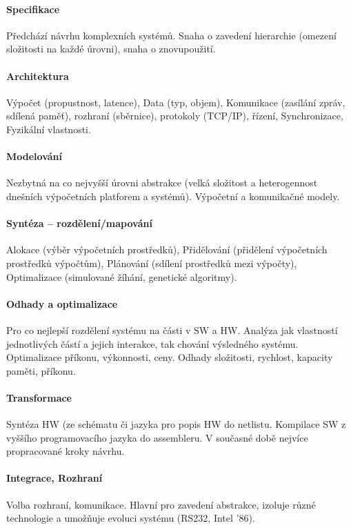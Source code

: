 \documentclass[a4paper, 11pt]{report}
\begin{document}
\paragraph{Specifikace}
Předchází návrhu komplexních systémů. Snaha o zavedení hierarchie (omezení složitosti na každé úrovni), snaha o znovupoužití.

\paragraph{Architektura}
Výpočet (propustnost, latence), Data (typ, objem), Komunikace (zasílání zpráv, sdílená paměť), rozhraní (sběrnice), protokoly (TCP/IP), řízení, Synchronizace, Fyzikální vlastnosti.

\paragraph{Modelování}
Nezbytná na co nejvyšší úrovni abstrakce (velká složitost a heterogennost dnešních výpočetních platforem a systémů). Výpočetní a komunikačné modely.

\paragraph{Syntéza -- rozdělení/mapování}
Alokace (výběr výpočetních prostředků), Přidělování (přidělení výpočetních prostředků výpočtům), Plánování (sdílení prostředků mezi výpočty), Optimalizace (simulované žíhání, genetické algoritmy).

\paragraph{Odhady a optimalizace}
Pro co nejlepší rozdělení systému na části v SW a HW. Analýza jak vlastností jednotlivých částí a jejich interakce, tak chování výsledného systému. Optimalizace příkonu, výkonnosti, ceny. Odhady složitosti, rychlost, kapacity paměti, příkonu.

\paragraph{Transformace}
Syntéza HW (ze schématu či jazyka pro popis HW do netlistu. Kompilace SW z vyššího programovacího jazyka do assembleru. V současné době nejvíce propracované kroky návrhu.

\paragraph{Integrace, Rozhraní}
Volba rozhraní, komunikace. Hlavní pro zavedení abstrakce, izoluje různé technologie a umožňuje evoluci systému (RS232, Intel '86).
\end{document}
